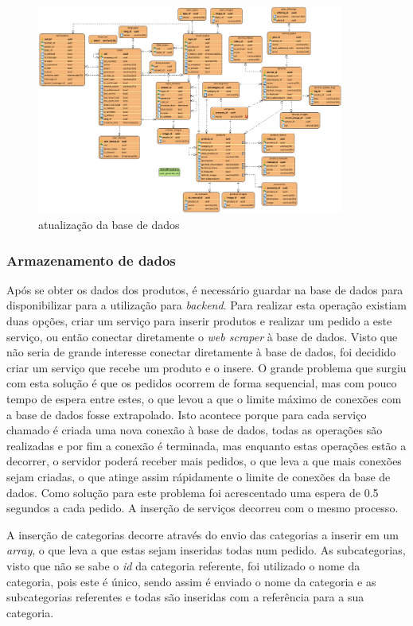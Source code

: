 \begin{figure}[htb]
    \centering
    \includegraphics[width=0.9\textwidth]{images/diagramas/bd_final.png}
    \caption{atualização da base de dados}
    \label{webscraper_bd}
\end{figure}

\newpage

\subsubsection{Armazenamento de dados}

Após se obter os dados dos produtos, é necessário guardar na base de dados para disponibilizar para a utilização para \textit{backend}. Para realizar esta operação existiam duas opções, criar um serviço para inserir produtos e realizar um pedido a este serviço, ou então conectar diretamente o \textit{web scraper} à base de dados. Visto que não seria de grande interesse conectar diretamente à base de dados, foi decidido criar um serviço que recebe um produto e o 
insere. O grande problema que surgiu com esta solução é que os pedidos ocorrem de forma sequencial, mas com pouco tempo de espera entre estes, o que levou a que o limite máximo de conexões com a base de dados fosse extrapolado. Isto acontece porque para cada serviço chamado é criada uma nova conexão à base de dados, todas as operações são realizadas e por fim a conexão é terminada, mas enquanto estas operações estão a decorrer, o servidor poderá receber mais pedidos, o que leva a que mais conexões sejam criadas, o que atinge assim rápidamente o limite de conexões da base de dados. Como solução para este problema foi acrescentado uma espera de 0.5 segundos a cada pedido. A inserção de serviços decorreu com o mesmo processo.

A inserção de categorias decorre através do envio das categorias a inserir em um \textit{array}, o que leva a que estas sejam inseridas todas num pedido. As subcategorias, visto que não se sabe o \textit{id} da categoria referente, foi utilizado o nome da categoria, pois este é único, sendo assim é enviado o nome da categoria e as subcategorias referentes e todas são inseridas com a referência para a sua categoria.
